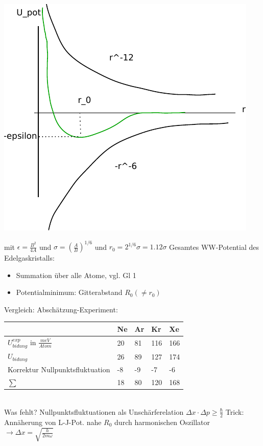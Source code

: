 	\begin{center}
		\includegraphics{figures/1_2graph.pdf}
	\end{center}
	mit $\epsilon = \frac{B^2}{4A}$ und $\sigma = \left(\frac{A}{B}\right)^{1/6}$\newline
	und $r_0 = 2^{1/6}\sigma=1.12\sigma$\newline
	Gesamtes WW-Potential des Edelgaskristalls:
	\begin{itemize}
		\item Summation über alle Atome, vgl. Gl 1
		\item Potentialminimum: Gitterabstand $R_0 (\neq r_0)$
	\end{itemize}
	Vergleich: Abschätzung-Experiment:
	\begin{table}[h]
		\centering
		\begin{tabular}{l|llll}
													& Ne & Ar & Kr  & Xe  \\ \hline
			$U_{bidung}^{exp}$ in $\frac{meV}{Atom}$ & 20 & 81 & 116 & 166 \\
			$U_{bidung}$                             & 26 & 89 & 127 & 174 \\
			Korrektur Nullpunktsfluktuation          & -8 & -9 & -7  & -6  \\
			$\sum$                                   & 18 & 80 & 120 & 168
		\end{tabular}
	\end{table}\\
	Was fehlt? Nullpunktsfluktuationen als Unschärferelation $\Delta x\cdot \Delta p \geq \frac{\hbar}{2}$\newline
	Trick: Annäherung von L-J-Pot. nahe $R_0$ durch harmonischen Oszillator \newline
	$\rightarrow \Delta x = \sqrt{\frac{h}{2m\omega}}$

